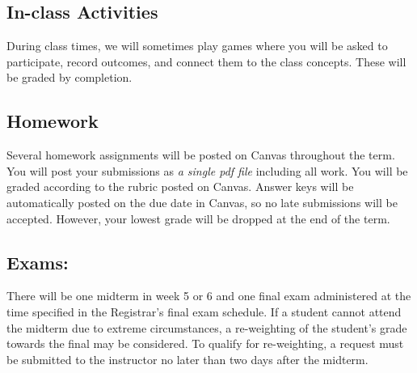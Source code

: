 \hypertarget{grading_activity}{\subsection{In-class Activities}}

  During class times, we will sometimes play games where you will be asked to participate, record outcomes, and connect them to the class concepts. These will be graded by completion. 

  \hypertarget{grading_HW}{\subsection{Homework}}

  Several homework assignments will be posted on Canvas throughout the term. You will post your submissions as \textit{a single pdf file} including all work. You will be graded according to the rubric posted on Canvas. 
  Answer keys will be automatically posted on the due date in Canvas, so no late submissions will be accepted. However, your lowest grade will be dropped at the end of the term.

 
\hypertarget{grading_exam}{\subsection{Exams:}}
  There will be one midterm in week 5 or 6 and one final exam administered at the time specified in the Registrar’s final exam schedule. If a student cannot attend the midterm due to extreme circumstances, a re-weighting of the student’s grade towards the final may be considered. To qualify for re-weighting, a request must be submitted to the instructor no later than two days after the midterm.


